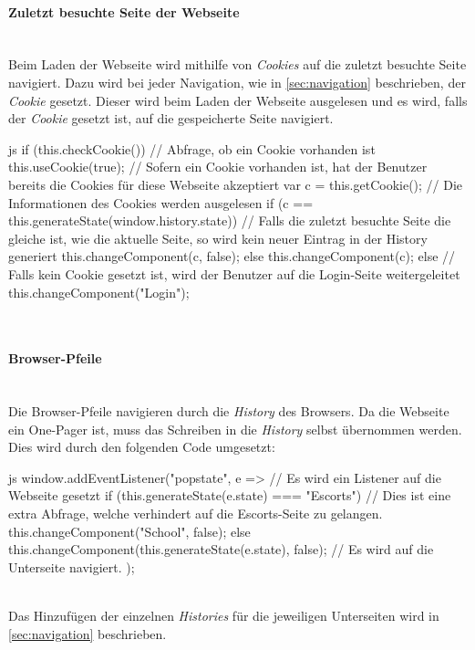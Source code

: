 \paragraph{Zuletzt besuchte Seite der Webseite}~\\
Beim Laden der Webseite wird mithilfe von \textit{Cookies} auf die zuletzt besuchte Seite navigiert. Dazu wird bei jeder Navigation, wie in \autoref{sec:navigation} beschrieben, der \textit{Cookie} gesetzt. Dieser wird beim Laden der Webseite ausgelesen und es wird, falls der \textit{Cookie} gesetzt ist, auf die gespeicherte Seite navigiert.
\begin{code}{js}
	if (this.checkCookie()) {		// Abfrage, ob ein Cookie vorhanden ist
		this.useCookie(true);		// Sofern ein Cookie vorhanden ist, hat der Benutzer bereits die Cookies für diese Webseite akzeptiert
		var c = this.getCookie();	// Die Informationen des Cookies werden ausgelesen
		if (c == this.generateState(window.history.state)) {	// Falls die zuletzt besuchte Seite die gleiche ist, wie die aktuelle Seite, so wird kein neuer Eintrag in der History generiert
			this.changeComponent(c, false);
		} else {
			this.changeComponent(c);
		}
	} else {
		// Falls kein Cookie gesetzt ist, wird der Benutzer auf die Login-Seite weitergeleitet
		this.changeComponent("Login");
	}
\end{code}
~\\

\paragraph{Browser-Pfeile}~\\
Die Browser-Pfeile navigieren durch die \textit{History} des Browsers. Da die Webseite ein One-Pager ist, muss das Schreiben in die \textit{History} selbst übernommen werden. Dies wird durch den folgenden Code umgesetzt:
\begin{code}{js}
window.addEventListener("popstate", e => {			// Es wird ein Listener auf die Webseite gesetzt
	if (this.generateState(e.state) === "Escorts") {	// Dies ist eine extra Abfrage, welche verhindert auf die Escorts-Seite zu gelangen.
		this.changeComponent("School", false);
	} else {
		this.changeComponent(this.generateState(e.state), false);	// Es wird auf die Unterseite navigiert.
	}
});
\end{code}
~\\
Das Hinzufügen der einzelnen \textit{Histories} für die jeweiligen Unterseiten wird in \autoref{sec:navigation} beschrieben.
\newpage
